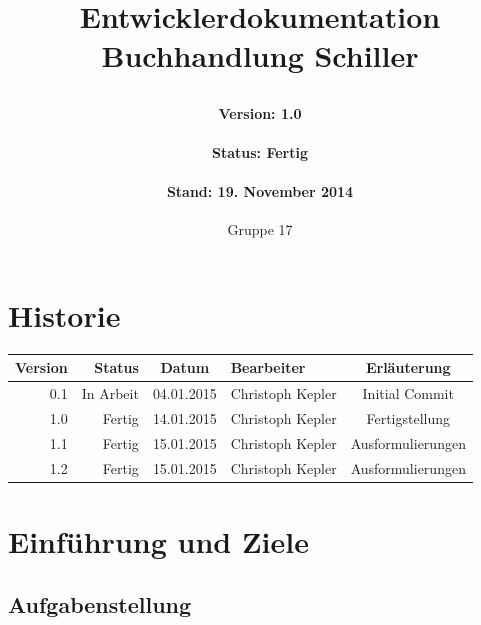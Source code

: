 \documentclass[a4paper]{article}
\author{Gruppe 17}
\date{}
\title{
	\normalfont
	\normalsize 
	\huge{Entwicklerdokumentation Buchhandlung Schiller}
	\horrule{0.5pt}
	\paragraph{Version: 1.0}
	\paragraph{Status: Fertig}
	\paragraph{Stand: 19. November 2014}
	\horrule{2pt}
}
\begin{document}
\maketitle

\newpage
 
\section*{Historie}

\begin{tabular}{|r|r|c|l|c|}
	\hline
	\rowcolor[HTML]{C0C0C0} 
	Version & Status    & Datum      & Bearbeiter       & Erläuterung    	\\ \hline
	0.1     & In Arbeit & 04.01.2015 & Christoph Kepler & Initial Commit 	\\ \hline
	1.0     & Fertig 	& 14.01.2015 & Christoph Kepler & Fertigstellung 	\\ \hline
	1.1     & Fertig 	& 15.01.2015 & Christoph Kepler & Ausformulierungen 	\\ \hline
	1.2     & Fertig 	& 15.01.2015 & Christoph Kepler & Ausformulierungen 	\\ \hline
\end{tabular}

\newpage

\tableofcontents

\newpage

\section{Einführung und Ziele}

\subsection{Aufgabenstellung}
\end{document}
